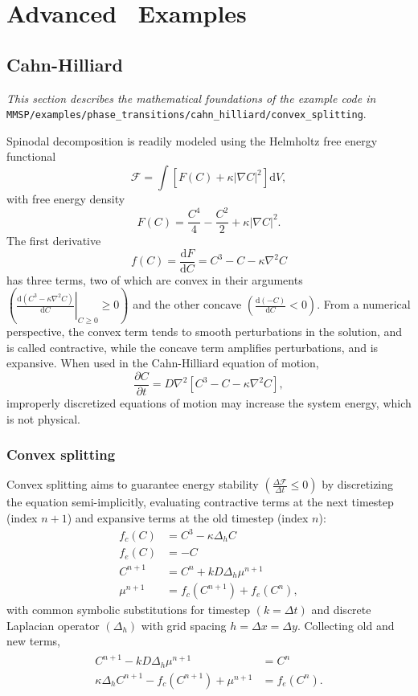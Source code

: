 
\chapter{Advanced \MMSP\ Examples}\label{ch:advanced}

\section{Cahn-Hilliard}
	\emph{This section describes the mathematical foundations of the example code in }
	{\tt MMSP/examples/phase\_transitions/cahn\_hilliard/convex\_splitting}.

	Spinodal decomposition is readily modeled using the Helmholtz free energy functional
	\[\mathcal{F} = \int\left[F(C) + \kappa|\nabla C|^2\right]\mathrm{d}V,\]
	with free energy density
	\[F(C) = \frac{C^4}{4} - \frac{C^2}{2} + \kappa|\nabla C|^2.\]
	The first derivative
	\[f(C) = \frac{\mathrm{d}F}{\mathrm{d}C} = C^3 - C - \kappa\nabla^2 C\]
	has three terms, two of which are convex in their arguments $\left(\left.\frac{\mathrm{d}(C^3 - \kappa\nabla^2 C)}{\mathrm{d}C}\right|_{C\geq0}\geq0\right)$
	and the other concave $\left(\frac{\mathrm{d}(-C)}{\mathrm{d}C}<0\right)$.
	From a numerical perspective, the convex term tends to smooth perturbations in the solution, and is called contractive, while the concave term
	amplifies perturbations, and is expansive.
	When used in the Cahn-Hilliard equation of motion,
	\[\frac{\partial C}{\partial t} = D\nabla^2\left[C^3 - C - \kappa\nabla^2C\right],\]
	improperly discretized equations of motion may increase the system energy, which is not physical.
	
	\subsection{Convex splitting}
	Convex splitting aims to guarantee energy stability $\left(\frac{\Delta\mathcal{F}}{\Delta t}\leq 0\right)$
	by discretizing the equation semi-implicitly, evaluating contractive terms at the next timestep (index $n+1$)
	and expansive terms at the old timestep (index $n$):
	\begin{align*}
		f_c(C) &= C^3 - \kappa\Delta_hC\\
		f_e(C) &= -C\\
		C^{n+1} &= C^n + kD\Delta_h\mu^{n+1}\\
		\mu^{n+1} &= f_c(C^{n+1}) + f_e(C^n),
	\end{align*}
	with common symbolic substitutions for timestep $(k=\Delta t)$ and discrete Laplacian operator $(\Delta_h)$
	with grid spacing $h=\Delta x=\Delta y$. Collecting old and new terms,
	\begin{align}
	\begin{split}
		C^{n+1} - kD\Delta_h\mu^{n+1} &= C^n\\
		\kappa\Delta_hC^{n+1} - f_c(C^{n+1}) + \mu^{n+1} &= f_e(C^n).
	\end{split}
	\label{eqn:convexeom}
	\end{align}
	
